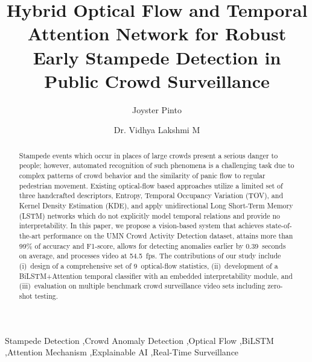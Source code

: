 \documentclass[a4paper,fleqn]{cas-dc}
\begin{document}
\let\WriteBookmarks\relax
\let\printorcid\relax


\title{\LARGE Hybrid Optical Flow and Temporal Attention Network for Robust Early Stampede Detection in Public Crowd Surveillance}

\author[1]{Joyster Pinto}

\author[1]{Dr. Vidhya Lakshmi M}


\begin{abstract}
Stampede events which occur in places of large crowds present a serious danger to people; however, automated recognition of such phenomena is a challenging task due to complex patterns of crowd behavior and the similarity of panic flow to regular pedestrian movement. Existing optical-flow based approaches utilize a limited set of three handcrafted descriptors, Entropy, Temporal Occupancy Variation (TOV), and Kernel Density Estimation (KDE), and apply unidirectional Long Short-Term Memory (LSTM) networks which do not explicitly model temporal relations and provide no interpretability. In this paper, we propose a vision-based system that achieves state-of-the-art performance on the UMN Crowd Activity Detection dataset, attains more than 99\% of accuracy and F1-score, allows for detecting anomalies earlier by 0.39~seconds on average, and processes video at 54.5~fps. The contributions of our study include (i)~design of a comprehensive set of 9~optical-flow statistics, (ii)~development of a BiLSTM+Attention temporal classifier with an embedded interpretability module, and (iii)~evaluation on multiple benchmark crowd surveillance video sets including zero-shot testing.
\end{abstract}

\begin{keywords}
Stampede Detection \sep Crowd Anomaly Detection \sep Optical Flow \sep BiLSTM \sep Attention Mechanism \sep Explainable AI \sep Real-Time Surveillance
\end{keywords}

\maketitle











\end{document}
